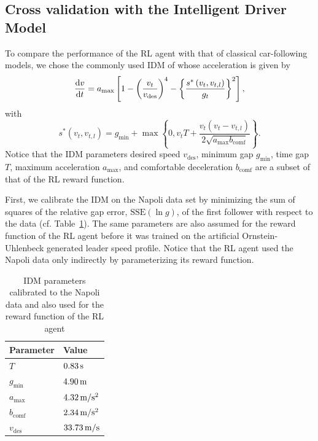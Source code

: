 \documentclass[review]{elsarticle}
\providecommand{\sub}[1]{_{\mathrm{#1}}}  %
\providecommand{\3}{{\ss}}
\begin{document}
	
	\subsection{Cross validation with the Intelligent Driver Model}
	\label{sec:crossValIDM}
	To compare the performance of the RL agent with that of
	classical car-following models, we chose the commonly used
	IDM of \cite{Opus} whose acceleration is given
	by 
	\begin{equation}
	\label{eq:IDM}
	\dv{v}{t}=a\sub{max}\left[1-\left(\frac{v_t}{v\sub{des}}\right)^{4}-\left\{\frac{s^{*}\left(v_t, v_{t,l}\right)}{g_t}\right\}^{2}\right],
	\end{equation}
	with
	\begin{equation}
	\label{eq:IDMsstar}
	s^{*}\left(v_t, v_{t,l}\right)=g\sub{min}+\max \left\{0,v_tT+\frac{v_t(v_t-v_{t,l})}{2 \sqrt{a\sub{max} b\sub{comf}}}\right\}.
	\end{equation}
	Notice that the IDM parameters desired
	speed $v\sub{des}$, minimum gap $g\sub{min}$, time gap $T$, maximum
	acceleration $a\sub{max}$, and
	comfortable deceleration $b\sub{comf}$ are a subset of that of the RL reward
	function. 
	
	First, we calibrate the IDM on the Napoli data set by
	minimizing the sum of squares of the relative gap error,
	$\mathrm{SSE}(\ln g)$, of the first follower with respect to the
	data (cf. Table~\ref{tab:IDMparameters}). The same parameters are also
	assumed for the reward function of the RL agent before it was trained
	on the artificial Ornstein-Uhlenbeck generated leader speed profile. Notice that the RL agent used the Napoli data only
	indirectly by parameterizing its reward function.
	
	\begin{table}
		\caption{IDM parameters calibrated to the Napoli
			data and also used for the reward function of the RL agent}
		\label{tab:IDMparameters} 
		\begin{center}
			\begin{tabular}{ p{} |p{}  } 
				Parameter & Value   \\ \hline
				$T$ & $\unit[0.83]{s}$\\
				$g\sub{min}$ & $\unit[4.90]{m}$\\
				$a\sub{max}$ & $\unit[4.32]{m/s^2}$\\
				$b\sub{comf}$ & $\unit[2.34]{ m/s^2}$\\
				$v\sub{des}$ & $\unit[33.73]{m/s}$			
			\end{tabular}
		\end{center}
	\end{table}
	
\end{document}
